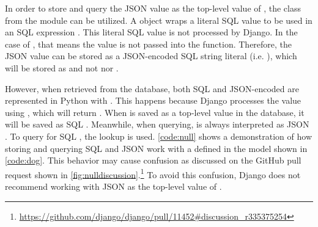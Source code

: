 In order to store and query the JSON  value as the top-level value
of , the  class from the 
module can be utilized. A  object wraps a literal SQL value to be
used in an SQL expression \cite{django:value}. This literal SQL value is not
processed by Django. In the case of , that means the value is
not passed into the  function. Therefore, the JSON
 value can be stored as a JSON-encoded SQL string literal (i.e.
), which will be stored as  and not
 nor .

\noindent
\begin{minipage}{\linewidth}

\end{minipage}

\noindent
\begin{minipage}{\linewidth}

\end{minipage}

However, when retrieved from the database, both SQL  and
JSON-encoded  are represented in Python with . This
happens because Django processes the  value using
, which will return . When  is saved
as a top-level value in the database, it will be saved as SQL .
Meanwhile, when querying,  is always interpreted as JSON
. To query for SQL , the  lookup is used.
\autoref{code:null} shows a demonstration of how storing and querying SQL
 and JSON  work with a  defined in the
 model shown in \autoref{code:dog}. This behavior may cause confusion
as discussed on the GitHub pull request shown
in \autoref{fig:nulldiscussion}.\footnote{\url{
	https://github.com/django/django/pull/11452\#discussion\_r335375254}}
To avoid this confusion, Django does not recommend working with JSON
 as the top-level value of .

